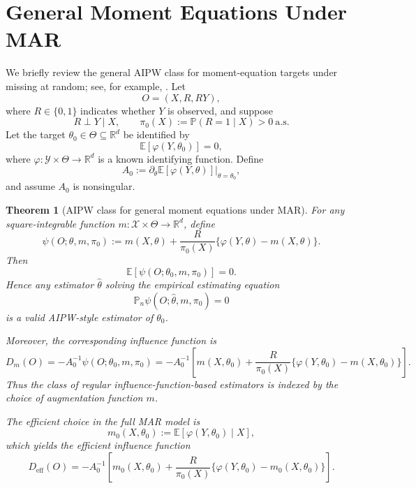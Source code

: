 \documentclass{article}
\theoremstyle{plain}
\newtheorem{theorem}{Theorem}
\theoremstyle{definition}
\newcommand{\E}{\mathbb{E}}
\newcommand{\Prob}{\mathbb{P}}
\newcommand{\R}{\mathbb{R}}
\newcommand{\1}{\mathbbm{1}}
\begin{document}
\section{General Moment Equations Under MAR}
\label{appendix::momentgeneral}
We briefly review the general AIPW class for moment-equation targets under missing at random; see, for example, \citet{robins1995analysis,vanderlaanunified}. Let
\[
O=(X,R,RY),
\]
where \(R\in\{0,1\}\) indicates whether \(Y\) is observed, and suppose
\[
R \perp Y \mid X,
\qquad
\pi_0(X):=\Prob(R=1\mid X)>0 \ \text{a.s.}
\]
Let the target \(\theta_0\in\Theta\subseteq\R^d\) be identified by
\[
\E[\varphi(Y,\theta_0)]=0,
\]
where \(\varphi:\mathcal Y\times\Theta\to\R^d\) is a known identifying function. Define
\[
A_0:=\partial_\theta \E[\varphi(Y,\theta)]\big|_{\theta=\theta_0},
\]
and assume \(A_0\) is nonsingular.

\begin{theorem}[AIPW class for general moment equations under MAR]
\label{thm:general-moment-aipw}
For any square-integrable function \(m:\mathcal X\times\Theta\to\R^d\), define
\begin{equation}
\label{eq:general-aipw-eq}
\psi(O;\theta,m,\pi_0)
:=
m(X,\theta)+\frac{R}{\pi_0(X)}\{\varphi(Y,\theta)-m(X,\theta)\}.
\end{equation}
Then
\[
\E[\psi(O;\theta_0,m,\pi_0)]=0.
\]
Hence any estimator \(\hat\theta\) solving the empirical estimating equation
\[
\mathbb P_n \psi(O;\hat\theta,m,\pi_0)=0
\]
is a valid AIPW-style estimator of \(\theta_0\).

Moreover, the corresponding influence function is
\begin{equation}
\label{eq:general-if}
D_m(O)
=
-A_0^{-1}\psi(O;\theta_0,m,\pi_0)
=
-A_0^{-1}\left[
m(X,\theta_0)+\frac{R}{\pi_0(X)}\{\varphi(Y,\theta_0)-m(X,\theta_0)\}
\right].
\end{equation}
Thus the class of regular influence-function-based estimators is indexed by the choice of augmentation function \(m\).

The efficient choice in the full MAR model is
\begin{equation}
\label{eq:general-efficient-m}
m_0(X,\theta_0):=\E[\varphi(Y,\theta_0)\mid X],
\end{equation}
which yields the efficient influence function
\begin{equation}
\label{eq:general-eif}
D_{\mathrm{eff}}(O)
=
-A_0^{-1}\left[
m_0(X,\theta_0)+\frac{R}{\pi_0(X)}\{\varphi(Y,\theta_0)-m_0(X,\theta_0)\}
\right].
\end{equation}
\end{theorem}
\end{document}

